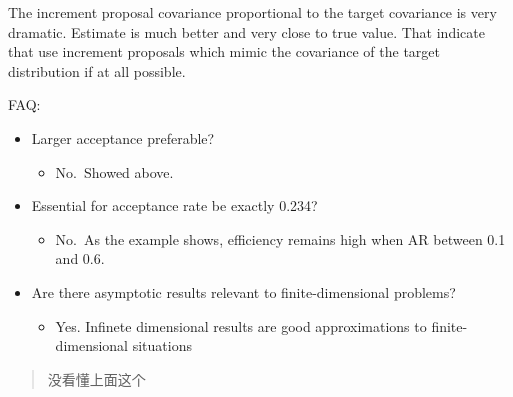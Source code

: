 \documentclass[
]{book}
\providecommand{\tightlist}{%
  \setlength{\itemsep}{0pt}\setlength{\parskip}{0pt}}
\theoremstyle{definition}
\theoremstyle{definition}
\theoremstyle{definition}
\theoremstyle{remark}
\begin{document}
The increment proposal covariance proportional to the target covariance is very dramatic. Estimate is much better and very close to true value. That indicate that use increment proposals which mimic the covariance of the target distribution if at all possible.

FAQ:

\begin{itemize}
\tightlist
\item
  Larger acceptance preferable?

  \begin{itemize}
  \tightlist
  \item
    No.~Showed above.
  \end{itemize}
\item
  Essential for acceptance rate be exactly 0.234?

  \begin{itemize}
  \tightlist
  \item
    No.~As the example shows, efficiency remains high when AR between 0.1 and 0.6.
  \end{itemize}
\item
  Are there asymptotic results relevant to finite-dimensional problems?

  \begin{itemize}
  \tightlist
  \item
    Yes. Infinete dimensional results are good approximations to finite-dimensional situations
  \end{itemize}
\end{itemize}

\begin{quote}
没看懂上面这个
\end{quote}
\end{document}
